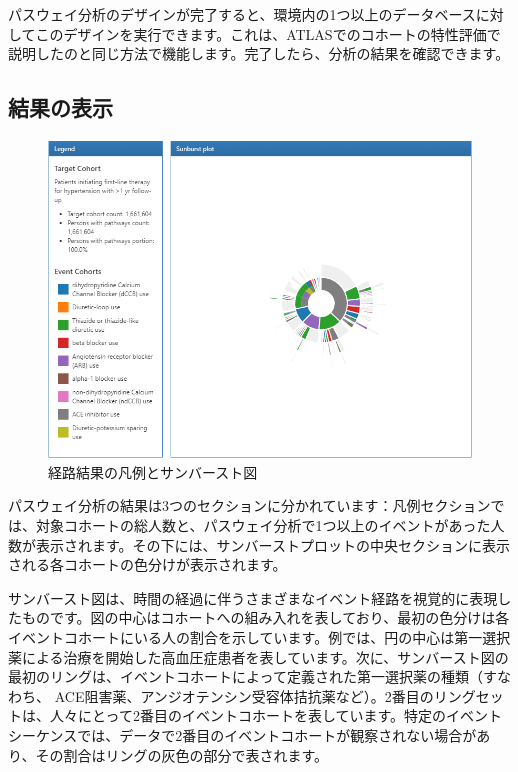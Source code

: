 \documentclass[
  11pt]{book}
\theoremstyle{definition}
\theoremstyle{definition}
\theoremstyle{definition}
\theoremstyle{definition}
\theoremstyle{remark}
\begin{document}
パスウェイ分析のデザインが完了すると、環境内の1つ以上のデータベースに対してこのデザインを実行できます。これは、ATLASでのコホートの特性評価で説明したのと同じ方法で機能します。完了したら、分析の結果を確認できます。

\subsection{結果の表示}\label{ux7d50ux679cux306eux8868ux793a}

\begin{figure}

{\centering \includegraphics[width=1\linewidth]{images/Characterization/atlasPathwaysResults} 

}

\caption{経路結果の凡例とサンバースト図}\label{fig:atlasPathwaysResults}
\end{figure}

パスウェイ分析の結果は3つのセクションに分かれています：凡例セクションでは、対象コホートの総人数と、パスウェイ分析で1つ以上のイベントがあった人数が表示されます。その下には、サンバーストプロットの中央セクションに表示される各コホートの色分けが表示されます。

サンバースト図は、時間の経過に伴うさまざまなイベント経路を視覚的に表現したものです。図の中心はコホートへの組み入れを表しており、最初の色分けは各イベントコホートにいる人の割合を示しています。例では、円の中心は第一選択薬による治療を開始した高血圧症患者を表しています。次に、サンバースト図の最初のリングは、イベントコホートによって定義された第一選択薬の種類（すなわち、 ACE阻害薬、アンジオテンシン受容体拮抗薬など）。2番目のリングセットは、人々にとって2番目のイベントコホートを表しています。特定のイベントシーケンスでは、データで2番目のイベントコホートが観察されない場合があり、その割合はリングの灰色の部分で表されます。
\end{document}
